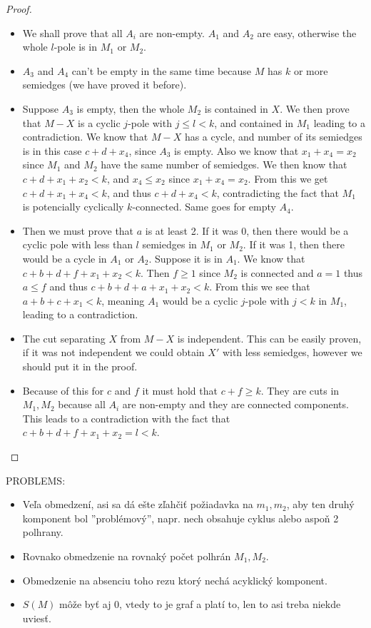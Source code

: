 \documentclass[12pt, twoside]{book}
\begin{document}
\begin{proof}
\begin{itemize}
		\item We shall prove that all $A_i$ are non-empty. $A_1$ and $A_2$ are easy, otherwise the whole $l$-pole is in $M_1$ or $M_2$.
		\item $A_3$ and $A_4$ can't be empty in the same time because $M$ has $k$ or more semiedges (we have proved it before).
		\item Suppose $A_3$ is empty, then the whole $M_2$ is contained in $X$. We then prove that $M-X$ is a cyclic $j$-pole with $j\leq l < k$, and contained in $M_1$ leading to a contradiction. We know that $M-X$ has a cycle, and number of its semiedges is in this case $c+d+x_4$, since $A_3$ is empty. Also we know that $x_1+x_4=x_2$ since $M_1$ and $M_2$ have the same number of semiedges. We then know that $c+d+x_1+x_2<k$, and $x_4\leq x_2$ since $x_1+x_4=x_2$. From this we get $c+d+x_1+x_4<k$, and thus $c+d+x_4<k$, contradicting the fact that $M_1$ is potencially cyclically $k$-connected. Same goes for empty $A_4$.
		\item Then we must prove that $a$ is at least 2. If it was 0, then there would be a cyclic pole with less than $l$ semiedges in $M_1$ or $M_2$. If it was 1, then there would be a cycle in $A_1$ or $A_2$. Suppose it is in $A_1$. We know that $c+b+d+f+x_1+x_2<k$. Then $f\geq 1$ since $M_2$ is connected and $a=1$ thus $a\leq f$ and thus $c+b+d+a+x_1+x_2<k$. From this we see that $a+b+c+x_1<k$, meaning $A_1$ would be a cyclic $j$-pole with $j<k$ in $M_1$, leading to a contradiction. 
		\item The cut separating $X$ from $M-X$ is independent. This can be easily proven, if it was not independent we could obtain $X'$ with less semiedges, however we should put it in the proof.
		\item Because of this for $c$ and $f$ it must hold that $c+f\geq k$. They are cuts in $M_1, M_2$ because all $A_i$ are non-empty and they are connected components. This leads to a contradiction with the fact that $c+b+d+f+x_1+x_2=l<k$.
	\end{itemize}
\end{proof}

PROBLEMS:

\begin{itemize}
	\item Veľa obmedzení, asi sa dá ešte zľahčiť požiadavka na $m_1,m_2$, aby ten druhý komponent bol ''problémový'', napr. nech obsahuje cyklus alebo aspoň 2 polhrany.
	\item Rovnako obmedzenie na rovnaký počet polhrán $M_1,M_2$.
	\item Obmedzenie na absenciu toho rezu ktorý nechá acyklický komponent.
	\item $S(M)$ môže byť aj 0, vtedy to je graf a platí to, len to asi treba niekde uviesť.
\end{itemize}
\end{document}

